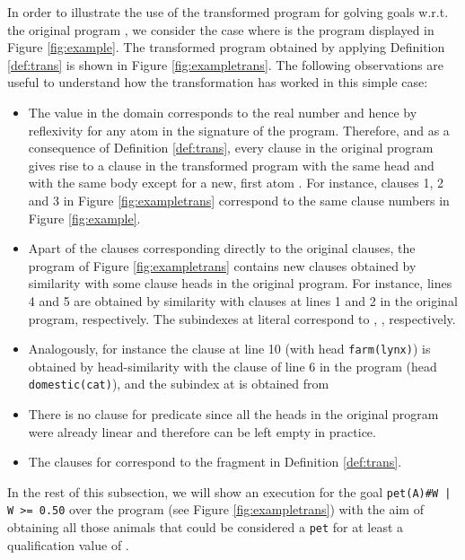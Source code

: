 \documentclass{sigplanconf}
\theoremstyle{definition}
\theoremstyle{plain}
\begin{document}
In order to illustrate the use of  the transformed program  for golving goals w.r.t. the original program , we consider the case where  is the  program displayed in Figure \ref{fig:example}. The transformed program  obtained by applying Definition \ref{def:trans} is shown in Figure \ref{fig:exampletrans}.  The following observations are useful to understand how the transformation has worked in this simple case:

\begin{itemize}
    \item The value  in the domain  corresponds to the real number  and hence by reflexivity  for any atom in the signature of the program. Therefore, and as a consequence of Definition \ref{def:trans}, every clause in the original program gives rise to a clause in the transformed program with the same head and with the same body except for a new, first atom . For instance, clauses 1, 2 and 3 in Figure \ref{fig:exampletrans} correspond to the same clause numbers in Figure \ref{fig:example}.

    \item Apart of the clauses corresponding directly to the original clauses, the program of Figure \ref{fig:exampletrans} contains new clauses obtained by  similarity with some clause heads in the original program. For instance,  lines 4 and 5  are obtained by similarity with clauses at lines 1 and 2 in the original program, respectively. The  subindexes at literal  correspond to , , respectively.

    \item Analogously, for instance the clause at line 10 (with head {\tt farm(lynx)}) is obtained by head-similarity with the clause of line 6 in the  program (head {\tt domestic(cat)}), and the subindex at  is obtained from
 

    \item There is no clause for predicate  since all the heads in the original program were already linear and therefore  can be left empty in practice.

    \item The clauses  for  correspond to the fragment  in Definition \ref{def:trans}.
\end{itemize}

In the rest of this subsection, we will show an execution for the goal \texttt{pet(A)\#W | W >= 0.50} over the program  (see Figure \ref{fig:exampletrans}) with the aim of obtaining all those animals that could be considered a \texttt{pet} for at least a qualification value of .
\end{document}
